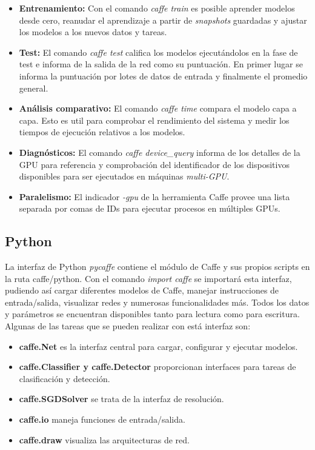 \documentclass[a4paper, 12pt, spanish, chapterprefix, numbers=noenddot]{book}
\begin{document}
\begin{itemize}
\item \textbf{Entrenamiento:}  Con el comando \textit{caffe train} es posible aprender modelos desde cero, reanudar el aprendizaje a partir de \textit{snapshots} guardadas y ajustar los modelos a los nuevos datos y tareas.
\item \textbf{Test:} El comando \textit{caffe test} califica los modelos ejecutándolos en la fase de test e informa de la salida de la red como su puntuación. En primer lugar se informa la puntuación por lotes de datos de entrada y finalmente el promedio general. 
\item \textbf{Análisis comparativo:} El comando \textit{caffe time} compara el modelo capa a capa. Esto es util para comprobar el rendimiento del sistema y medir los tiempos de ejecución relativos a los modelos.
\item \textbf{Diagnósticos:} El comando \textit{caffe device\_query} informa de los detalles de la GPU para referencia y comprobación del identificador de los dispositivos disponibles para ser ejecutados en máquinas \textit{multi-GPU}.
\item \textbf{Paralelismo:} El indicador \textit{-gpu} de la herramienta Caffe provee una lista separada por comas de IDs para ejecutar procesos en múltiples GPUs.
\end{itemize}

\subsection{Python}

La interfaz de Python \textit{pycaffe}\cite{CaffeInterface} contiene el módulo de Caffe y sus propios scripts en la ruta caffe/python. Con el comando \textit{import caffe} se importará esta interfaz, pudiendo así cargar diferentes modelos de Caffe, manejar instrucciones de entrada/salida, visualizar redes y numerosas funcionalidades más. Todos los datos y parámetros se encuentran disponibles tanto para lectura como para escritura. Algunas de las tareas que se pueden realizar con está interfaz son:

\begin{itemize}
\item \textbf{caffe.Net} es la interfaz central para cargar, configurar y ejecutar modelos.
\item \textbf{caffe.Classifier y caffe.Detector} proporcionan interfaces para tareas de clasificación y detección.
\item \textbf{caffe.SGDSolver} se trata de la interfaz de resolución.
\item \textbf{caffe.io} maneja funciones de entrada/salida.
\item \textbf{caffe.draw} visualiza las arquitecturas de red.
\end{itemize}
\end{document}
